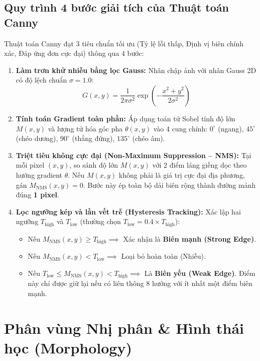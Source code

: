 \subsection{Quy trình 4 bước giải tích của Thuật toán Canny}
Thuật toán Canny \cite{canny1986computational} đạt 3 tiêu chuẩn tối ưu (Tỷ lệ lỗi thấp, Định vị biên chính xác, Đáp ứng đơn cực đại) thông qua 4 bước:
\begin{enumerate}
    \item \textbf{Làm trơn khử nhiễu bằng lọc Gauss:} Nhân chập ảnh với nhân Gauss 2D có độ lệch chuẩn $\sigma = 1.0$:
    \begin{equation}
    G(x, y) = \frac{1}{2\pi \sigma^2} \exp\left(-\frac{x^2 + y^2}{2\sigma^2}\right)
    \end{equation}
    \item \textbf{Tính toán Gradient toàn phần:} Áp dụng toán tử Sobel tính độ lớn $M(x, y)$ và lượng tử hóa góc pha $\theta(x, y)$ vào 4 cung chính: $0^\circ$ (ngang), $45^\circ$ (chéo dương), $90^\circ$ (thẳng đứng), $135^\circ$ (chéo âm).
    \item \textbf{Triệt tiêu không cực đại (Non-Maximum Suppression -- NMS):}
    Tại mỗi pixel $(x, y)$, so sánh độ lớn $M(x, y)$ với 2 điểm láng giềng dọc theo hướng gradient $\theta$. Nếu $M(x, y)$ không phải là giá trị cực đại địa phương, gán $M_{\text{NMS}}(x, y) = 0$. Bước này ép toàn bộ dải biên rộng thành đường mảnh đúng \textbf{1 pixel}.
    \item \textbf{Lọc ngưỡng kép và lần vết trễ (Hysteresis Tracking):}
    Xác lập hai ngưỡng $T_{\text{high}}$ và $T_{\text{low}}$ (thường chọn $T_{\text{low}} = 0.4 \times T_{\text{high}}$):
    \begin{itemize}
        \item Nếu $M_{\text{NMS}}(x, y) \ge T_{\text{high}} \implies$ Xác nhận là \textbf{Biên mạnh (Strong Edge)}.
        \item Nếu $M_{\text{NMS}}(x, y) < T_{\text{low}} \implies$ Loại bỏ hoàn toàn (Nhiễu).
        \item Nếu $T_{\text{low}} \le M_{\text{NMS}}(x, y) < T_{\text{high}} \implies$ Là \textbf{Biên yếu (Weak Edge)}. Điểm này chỉ được giữ lại nếu có liên thông 8 hướng với ít nhất một điểm biên mạnh.
    \end{itemize}
\end{enumerate}



\section{Phân vùng Nhị phân \& Hình thái học (Morphology)}
